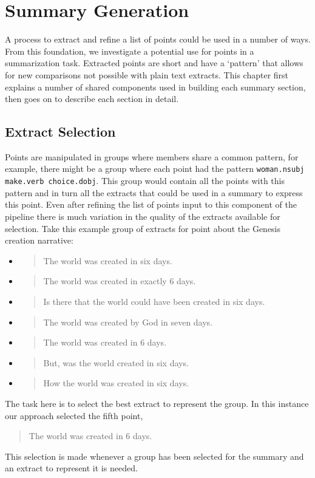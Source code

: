 \chapter{Summary Generation\label{chap:summary-generation}}
  A process to extract and refine a list of points could be used in a number of ways. From this foundation, we investigate a potential use for points in a summarization task. Extracted points are short and have a `pattern' that allows for new comparisons not possible with plain text extracts. This chapter first explains a number of shared components used in building each summary section, then goes on to describe each section in detail.

  \section{Extract Selection}
    Points are manipulated in groups where members share a common pattern, for example, there might be a group where each point had the pattern \texttt{woman.nsubj make.verb choice.dobj}. This group would contain all the points with this pattern and in turn all the extracts that could be used in a summary to express this point. Even after refining the list of points input to this component of the pipeline there is much variation in the quality of the extracts available for selection. Take this example group of extracts for point about the Genesis creation narrative:

    \begin{itemize}[label={}]
      \item{\blockquote{The world was created in six days.}}
      \item{\blockquote{The world was created in exactly 6 days.}}
      \item{\blockquote{Is there that the world could have been created in six days.}}
      \item{\blockquote{The world was created by God in seven days.}}
      \item{\blockquote{The world was created in 6 days.}}
      \item{\blockquote{But, was the world created in six days.}}
      \item{\blockquote{How the world was created in six days.}}
    \end{itemize}

    The task here is to select the best extract to represent the group. In this instance our approach selected the fifth point, \blockquote{The world was created in 6 days.}. This selection is made whenever a group has been selected for the summary and an extract to represent it is needed.

